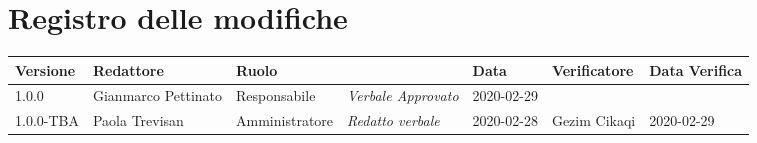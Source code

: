 \section*{Registro delle modifiche}
\renewcommand{\arraystretch}{1.8}

  \setlength\LTleft{-1.7cm}
  \begin{longtable}{|p{1.5cm}|p{1.7cm}|p{2cm}|p{2cm}|p{1.7cm}|p{2cm}|p{1.7cm}|}
    \hline

    \rowcolor{header}
    \textbf{Versione} & \textbf{Redattore} & \textbf{Ruolo} & \centering{\textbf{Descrizione}} & \textbf{Data} & \textbf{Verificatore} & \textbf{Data Verifica}\\

    \hline
    1.0.0 & Gianmarco Pettinato & Responsabile & \small{\textit{Verbale Approvato}} & 2020-02-29 & &\\
	  1.0.0-TBA & Paola Trevisan & Amministratore & \small{\textit{Redatto verbale}} & 2020-02-28 & Gezim Cikaqi & 2020-02-29 \\
    \hline
  \end{longtable}
  \setlength\LTleft{0cm}
